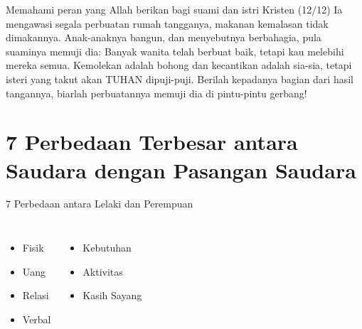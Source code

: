 \documentclass{beamer}
\theoremstyle{mystyle}
\begin{document}
\begin{frame}{Memahami peran yang Allah berikan bagi suami dan istri Kristen (12/12)}
Ia mengawasi segala perbuatan rumah tangganya, makanan kemalasan tidak dimakannya. Anak-anaknya bangun, dan menyebutnya berbahagia, pula suaminya memuji dia: Banyak wanita telah berbuat baik, tetapi kau melebihi mereka semua. Kemolekan adalah bohong dan kecantikan adalah sia-sia, tetapi isteri yang takut akan TUHAN dipuji-puji. Berilah kepadanya bagian dari hasil tangannya, biarlah perbuatannya memuji dia di pintu-pintu gerbang!  				
\end{frame}

\section{7 Perbedaan Terbesar antara Saudara dengan Pasangan Saudara}
\begin{frame}{7 Perbedaan antara Lelaki dan Perempuan}
	\begin{columns}[c]		
		\column{1.5in}
		\begin{itemize}
			\item<2-> Fisik
			\hfill \break
			\item<3-> Uang
			\hfill \break
			\item<4-> Relasi
			\hfill \break
			\item<5-> Verbal
		\end{itemize}		
		\column{2.5in}
		\begin{itemize}
			\item<6-> Kebutuhan 
			\hfill \break
			\item<7-> Aktivitas
			\hfill \break
			\item<8-> Kasih Sayang
		\end{itemize}				
	\end{columns}
\end{frame}
\end{document}

